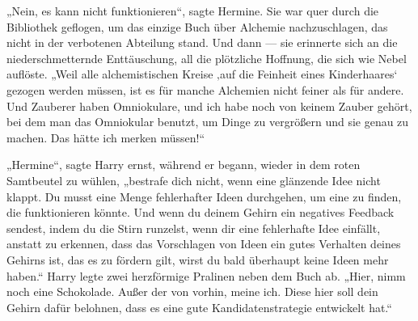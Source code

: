 „Nein, es kann nicht funktionieren“, sagte Hermine. Sie war quer durch die Bibliothek geflogen, um das einzige Buch über Alchemie nachzuschlagen, das nicht in der verbotenen Abteilung stand. Und dann — sie erinnerte sich an die niederschmetternde Enttäuschung, all die plötzliche Hoffnung, die sich wie Nebel auflöste.
„Weil alle alchemistischen Kreise ‚auf die Feinheit eines Kinderhaares‘ gezogen werden müssen, ist es für manche Alchemien nicht feiner als für andere. Und Zauberer haben Omniokulare, und ich habe noch von keinem Zauber gehört, bei dem man das Omniokular benutzt, um Dinge zu vergrößern und sie genau zu machen. Das hätte ich merken müssen!“

„Hermine“, sagte Harry ernst, während er begann, wieder in dem roten Samtbeutel zu wühlen, „bestrafe dich nicht, wenn eine glänzende Idee nicht klappt. Du musst eine Menge fehlerhafter Ideen durchgehen, um eine zu finden, die funktionieren könnte. Und wenn du deinem Gehirn ein negatives Feedback sendest, indem du die Stirn runzelst, wenn dir eine fehlerhafte Idee einfällt, anstatt zu erkennen, dass das Vorschlagen von Ideen ein gutes Verhalten deines Gehirns ist, das es zu fördern gilt, wirst du bald überhaupt keine Ideen mehr haben.“
Harry legte zwei herzförmige Pralinen neben dem Buch ab.
„Hier, nimm noch eine Schokolade. Außer der von vorhin, meine ich. Diese hier soll dein Gehirn dafür belohnen, dass es eine gute Kandidatenstrategie entwickelt hat.“

